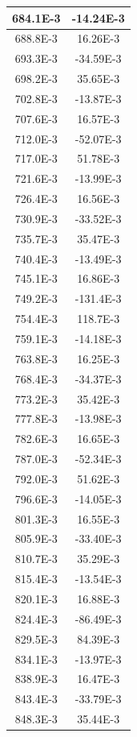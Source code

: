 \documentclass[english, 12pt, a4paper]{ifimaster}
\begin{document}
\begin{appendices}
\begin{center}
\begin{longtable}[htbp]{|c|c|}
\hline
  684.1E-3 & -14.24E-3 \\
\hline
  688.8E-3 & 16.26E-3 \\
\hline
  693.3E-3 & -34.59E-3 \\
\hline
  698.2E-3 & 35.65E-3 \\
\hline
  702.8E-3 & -13.87E-3 \\
\hline
  707.6E-3 & 16.57E-3 \\
\hline
  712.0E-3 & -52.07E-3 \\
\hline
  717.0E-3 & 51.78E-3 \\
\hline
  721.6E-3 & -13.99E-3 \\
\hline
  726.4E-3 & 16.56E-3 \\
\hline
  730.9E-3 & -33.52E-3 \\
\hline
  735.7E-3 & 35.47E-3 \\
\hline
  740.4E-3 & -13.49E-3 \\
\hline
  745.1E-3 & 16.86E-3 \\
\hline
  749.2E-3 & -131.4E-3 \\
\hline
  754.4E-3 & 118.7E-3 \\
\hline
  759.1E-3 & -14.18E-3 \\
\hline
  763.8E-3 & 16.25E-3 \\
\hline
  768.4E-3 & -34.37E-3 \\
\hline
  773.2E-3 & 35.42E-3 \\
\hline
  777.8E-3 & -13.98E-3 \\
\hline
  782.6E-3 & 16.65E-3 \\
\hline
  787.0E-3 & -52.34E-3 \\
\hline
  792.0E-3 & 51.62E-3 \\
\hline
  796.6E-3 & -14.05E-3 \\
\hline
  801.3E-3 & 16.55E-3 \\
\hline
  805.9E-3 & -33.40E-3 \\
\hline
  810.7E-3 & 35.29E-3 \\
\hline
  815.4E-3 & -13.54E-3 \\
\hline
  820.1E-3 & 16.88E-3 \\
\hline
  824.4E-3 & -86.49E-3 \\
\hline
  829.5E-3 & 84.39E-3 \\
\hline
  834.1E-3 & -13.97E-3 \\
\hline
  838.9E-3 & 16.47E-3 \\
\hline
  843.4E-3 & -33.79E-3 \\
\hline
  848.3E-3 & 35.44E-3 \\

\end{longtable}
\end{center}
\end{appendices}
\end{document}
